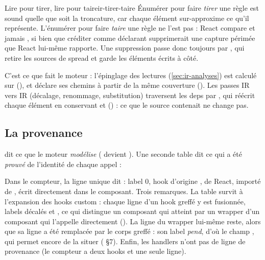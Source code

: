 
\begin{invariant}{Lire pour tirer, lire pour taire}{ir-tirer-taire}
Énumérer  pour faire \emph{tirer} une règle est sound quelle que soit la troncature, car chaque élément sur-approxime ce qu'il représente. L'énumérer pour faire \emph{taire} une règle ne l'est pas : React compare  et jamais , si bien que créditer \code{[...rows]} comme déclarant  supprimerait une capture périmée que React lui-même rapporte. Une suppression passe donc toujours par , qui retire les sources de spread et garde les éléments écrits à côté.
\end{invariant}

C'est ce que fait le moteur : l'épinglage des lectures (\cref{sec:ir-analyses}) est calculé sur  (), et  déclare ses chemins à partir de la même couverture (). Les passes IR vers IR (décalage, renommage, substitution) traversent les deps par , qui réécrit chaque élément en conservant  et  () : ce que le source contenait ne change pas.

\subsection{La provenance}

 dit ce que le moteur \emph{modélise} ( devient ). Une seconde table dit ce qui a été \emph{prouvé} de l'identité de chaque appel :


Dans le compteur, la ligne unique dit : label 0, hook d'origine , de React, importé de , écrit directement dans le composant. Trois remarques. La table survit à l'expansion des hooks custom : chaque ligne d'un hook greffé y est fusionnée, labels décalés et , ce qui distingue un composant qui atteint  par un wrapper d'un composant qui l'appelle directement (). La ligne du wrapper lui-même reste, alors que sa ligne  a été remplacée par le corps greffé : son label \emph{pend}, d'où le champ , qui permet encore de la situer ( §7). Enfin, les handlers n'ont pas de ligne de provenance (le compteur a deux hooks et une seule ligne).

